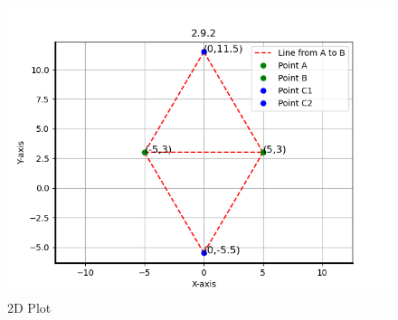 \documentclass{beamer}
\begin{document}
\begin{figure}[H]
    \centering
    \includegraphics[width=0.8\columnwidth]{figs/fig1.png}
    \caption{2D Plot}
    \label{3D Plot}
\end{figure}
\end{document}
